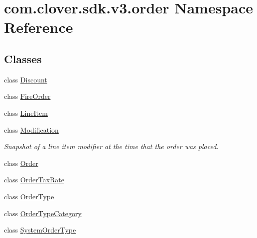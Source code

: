 \hypertarget{namespacecom_1_1clover_1_1sdk_1_1v3_1_1order}{}\section{com.\+clover.\+sdk.\+v3.\+order Namespace Reference}
\label{namespacecom_1_1clover_1_1sdk_1_1v3_1_1order}
\subsection*{Classes}
\begin{DoxyCompactItemize}
\item 
class \hyperlink{classcom_1_1clover_1_1sdk_1_1v3_1_1order_1_1_discount}{Discount}
\item 
class \hyperlink{classcom_1_1clover_1_1sdk_1_1v3_1_1order_1_1_fire_order}{Fire\+Order}
\item 
class \hyperlink{classcom_1_1clover_1_1sdk_1_1v3_1_1order_1_1_line_item}{Line\+Item}
\item 
class \hyperlink{classcom_1_1clover_1_1sdk_1_1v3_1_1order_1_1_modification}{Modification}
\begin{DoxyCompactList}\small\item\em Snapshot of a line item modifier at the time that the order was placed. \end{DoxyCompactList}\item 
class \hyperlink{classcom_1_1clover_1_1sdk_1_1v3_1_1order_1_1_order}{Order}
\item 
class \hyperlink{classcom_1_1clover_1_1sdk_1_1v3_1_1order_1_1_order_tax_rate}{Order\+Tax\+Rate}
\item 
class \hyperlink{classcom_1_1clover_1_1sdk_1_1v3_1_1order_1_1_order_type}{Order\+Type}
\item 
class \hyperlink{classcom_1_1clover_1_1sdk_1_1v3_1_1order_1_1_order_type_category}{Order\+Type\+Category}
\item 
class \hyperlink{classcom_1_1clover_1_1sdk_1_1v3_1_1order_1_1_system_order_type}{System\+Order\+Type}
\end{DoxyCompactItemize}

